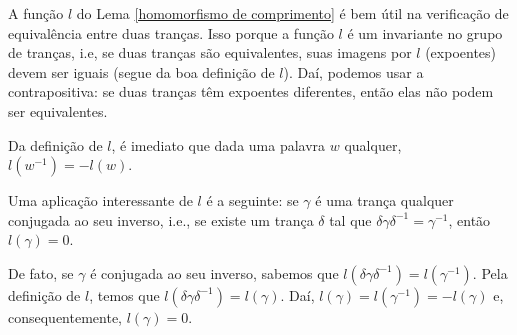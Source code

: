 	\begin{remark}
		A função $l$ do Lema \eqref{homomorfismo de comprimento} é bem útil na verificação de equivalência entre duas tranças. Isso porque a função $l$ é um invariante no grupo de tranças, i.e, se duas tranças são equivalentes, suas imagens por $l$ (expoentes) devem ser iguais (segue da boa definição de $l$). Daí, podemos usar a contrapositiva: se duas tranças têm expoentes diferentes, então elas não podem ser equivalentes.
	\end{remark}
	
	\par\vspace{0.3cm} Da definição de $l$, é imediato que dada uma palavra $w$ qualquer, $l(w^{-1}) = -l(w)$.
	
	\par\vspace{0.3cm} Uma aplicação interessante de $l$ é a seguinte: se $\gamma$ é uma trança qualquer conjugada ao seu inverso, i.e., se existe um trança $\delta$ tal que $\delta\gamma\delta^{-1} = \gamma^{-1}$, então $l(\gamma) = 0$.
	
	\par\vspace{0.3cm} De fato, se $\gamma$ é conjugada ao seu inverso, sabemos que $l(\delta\gamma\delta^{-1}) = l(\gamma^{-1})$. Pela definição de $l$, temos que $l(\delta\gamma\delta^{-1}) = l(\gamma)$. Daí, $l(\gamma) = l(\gamma^{-1}) = -l(\gamma)$ e, consequentemente, $l(\gamma) = 0$.
	
	
	
	
	
